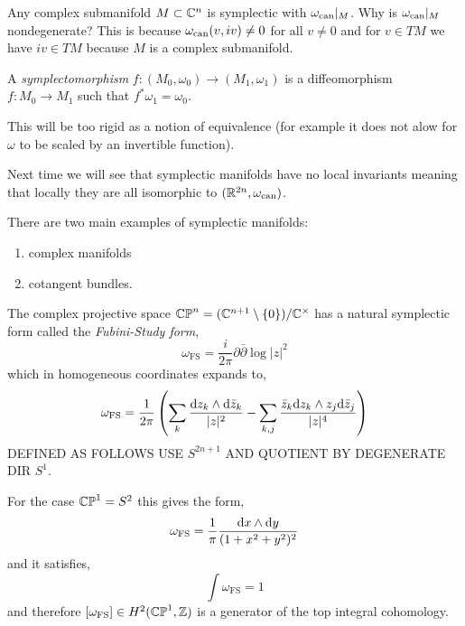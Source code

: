 \documentclass[12pt]{article}
\begin{document}
\begin{example}
Any complex submanifold $M \subset \mathbb{C}^n$ is symplectic with $\omega_{\text{can}}|_M$. Why is $\omega_{\text{can}}|_M$ nondegenerate? This is because $\omega_{\text{can}}(v, iv) \neq 0$ for all $v \neq 0$ and for $v \in TM$ we have $iv \in TM$ because $M$ is a complex submanifold.
\end{example}

\begin{defn}
A \textit{symplectomorphism} $f : (M_0, \omega_0) \to (M_1, \omega_1)$ is a diffeomorphism $f: M_0 \to M_1$ such that $f^* \omega_1 = \omega_0$. 
\end{defn}

\begin{rmk}
This will be too rigid as a notion of equivalence (for example it does not alow for $\omega$ to be scaled by an invertible function). 
\end{rmk}

\begin{rmk}
Next time we will see that symplectic manifolds have no local invariants meaning that locally they are all isomorphic to $(\mathbb{R}^{2n}, \omega_{\text{can}})$. 
\end{rmk}

\begin{example}
There are two main examples of symplectic manifolds:
\begin{enumerate}
\item complex \kahler manifolds
\item cotangent bundles.
\end{enumerate}
\end{example}

\newcommand{\FS}{\text{FS}}

\begin{example}
The complex projective space $\mathbb{CP}^n = (\mathbb{C}^{n+1} \setminus \{ 0 \}) / \mathbb{C}^\times$ has a natural symplectic form called the \textit{Fubini-Study form},
\[ \omega_{\FS} = \frac{i}{2\pi} \partial \bar{\partial} \log{|z|^2} \]
which in homogeneous coordinates expands to,
\[ \omega_{\FS} = \frac{1}{2\pi} \left( \sum_k \frac{\d{z_k} \wedge \d{\bar{z}_k}}{|z|^2} - \sum_{k,j} \frac{\bar{z}_k \d{z_k} \wedge z_j \d{\bar{z}_j}}{|z|^4} \right) \]
DEFINED AS FOLLOWS USE $S^{2n+1}$ AND QUOTIENT BY DEGENERATE DIR $S^1$. 
\end{example}

\begin{rmk}
For the case $\mathbb{CP}^1 = S^2$ this gives the form,
\[ \omega_{\FS} = \frac{1}{\pi} \frac{\d{x} \wedge \d{y}}{(1 + x^2 + y^2)^2} \]
and it satisfies,
\[ \int \omega_{\FS} = 1 \]
and therefore $[\omega_{\FS}] \in H^2(\CP^1, \Z)$ is a generator of the top integral cohomology. 
\end{rmk}
\end{document}
